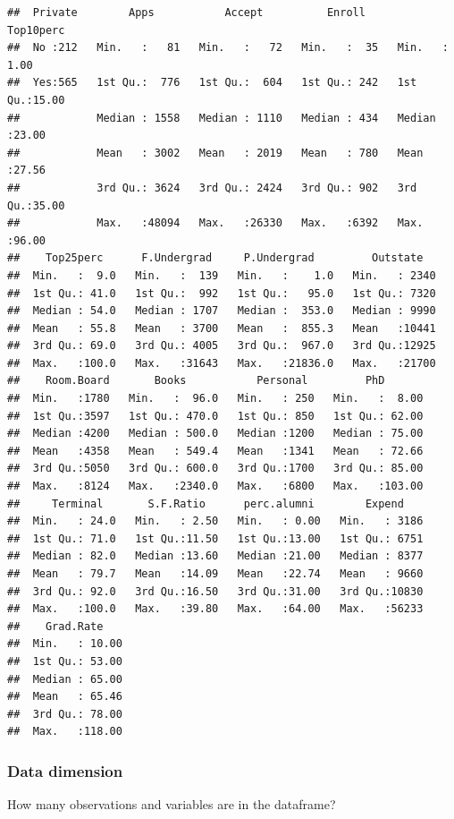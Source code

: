 \documentclass[]{article}
\begin{document}
\begin{verbatim}
##  Private        Apps           Accept          Enroll       Top10perc    
##  No :212   Min.   :   81   Min.   :   72   Min.   :  35   Min.   : 1.00  
##  Yes:565   1st Qu.:  776   1st Qu.:  604   1st Qu.: 242   1st Qu.:15.00  
##            Median : 1558   Median : 1110   Median : 434   Median :23.00  
##            Mean   : 3002   Mean   : 2019   Mean   : 780   Mean   :27.56  
##            3rd Qu.: 3624   3rd Qu.: 2424   3rd Qu.: 902   3rd Qu.:35.00  
##            Max.   :48094   Max.   :26330   Max.   :6392   Max.   :96.00  
##    Top25perc      F.Undergrad     P.Undergrad         Outstate    
##  Min.   :  9.0   Min.   :  139   Min.   :    1.0   Min.   : 2340  
##  1st Qu.: 41.0   1st Qu.:  992   1st Qu.:   95.0   1st Qu.: 7320  
##  Median : 54.0   Median : 1707   Median :  353.0   Median : 9990  
##  Mean   : 55.8   Mean   : 3700   Mean   :  855.3   Mean   :10441  
##  3rd Qu.: 69.0   3rd Qu.: 4005   3rd Qu.:  967.0   3rd Qu.:12925  
##  Max.   :100.0   Max.   :31643   Max.   :21836.0   Max.   :21700  
##    Room.Board       Books           Personal         PhD        
##  Min.   :1780   Min.   :  96.0   Min.   : 250   Min.   :  8.00  
##  1st Qu.:3597   1st Qu.: 470.0   1st Qu.: 850   1st Qu.: 62.00  
##  Median :4200   Median : 500.0   Median :1200   Median : 75.00  
##  Mean   :4358   Mean   : 549.4   Mean   :1341   Mean   : 72.66  
##  3rd Qu.:5050   3rd Qu.: 600.0   3rd Qu.:1700   3rd Qu.: 85.00  
##  Max.   :8124   Max.   :2340.0   Max.   :6800   Max.   :103.00  
##     Terminal       S.F.Ratio      perc.alumni        Expend     
##  Min.   : 24.0   Min.   : 2.50   Min.   : 0.00   Min.   : 3186  
##  1st Qu.: 71.0   1st Qu.:11.50   1st Qu.:13.00   1st Qu.: 6751  
##  Median : 82.0   Median :13.60   Median :21.00   Median : 8377  
##  Mean   : 79.7   Mean   :14.09   Mean   :22.74   Mean   : 9660  
##  3rd Qu.: 92.0   3rd Qu.:16.50   3rd Qu.:31.00   3rd Qu.:10830  
##  Max.   :100.0   Max.   :39.80   Max.   :64.00   Max.   :56233  
##    Grad.Rate     
##  Min.   : 10.00  
##  1st Qu.: 53.00  
##  Median : 65.00  
##  Mean   : 65.46  
##  3rd Qu.: 78.00  
##  Max.   :118.00
\end{verbatim}

\subsubsection{Data dimension}\label{data-dimension}

How many observations and variables are in the dataframe?
\end{document}

